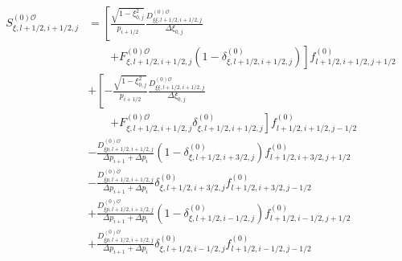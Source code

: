 \begin{itemize}
\begin{align}
S_{\xi,l+1/2,i+1/2,j}^{\left(  0\right)  \mathcal{O}} &  =\left[  \frac
{\sqrt{1-\xi_{0,j}^{2}}}{p_{i+1/2}}\frac{D_{\xi\xi,l+1/2,i+1/2,j}%
^{(0)\mathcal{O}}}{\Delta\xi_{0,j}}\right.\nonumber\\&\qquad\left.+F_{\xi,l+1/2,i+1/2,j}^{(0)\mathcal{O}%
}\left(  1-\delta_{\xi,l+1/2,i+1/2,j}^{\left(  0\right)  }\right)
\right]
f_{l+1/2,i+1/2,j+1/2}^{\left(  0\right)  }\label{sxi0dis}\\
&  +\left[  -\frac{\sqrt{1-\xi_{0,j}^{2}}}{p_{i+1/2}}\frac{D_{\xi
\xi,l+1/2,i+1/2,j}^{(0)\mathcal{O}}}{\Delta\xi_{0,j}}\right.\nonumber\\&\qquad\left.+F_{\xi,l+1/2,i+1/2,j}%
^{(0)\mathcal{O}}\delta_{\xi,l+1/2,i+1/2,j}^{\left(  0\right)
}\right]
f_{l+1/2,i+1/2,j-1/2}^{\left(  0\right)  }\nonumber\\
&  -\frac{D_{\xi p,l+1/2,i+1/2,j}^{(0)\mathcal{O}}}{\Delta p_{i+1}+\Delta
p_{i}}\left(  1-\delta_{\xi,l+1/2,i+3/2,j}^{\left(  0\right)  }\right)
f_{l+1/2,i+3/2,j+1/2}^{\left(  0\right)  }\nonumber\\
&  -\frac{D_{\xi p,l+1/2,i+1/2,j}^{(0)\mathcal{O}}}{\Delta p_{i+1}+\Delta
p_{i}}\delta_{\xi,l+1/2,i+3/2,j}^{\left(  0\right)  }f_{l+1/2,i+3/2,j-1/2}%
^{\left(  0\right)  }\nonumber\\
&  +\frac{D_{\xi p,l+1/2,i+1/2,j}^{(0)\mathcal{O}}}{\Delta p_{i+1}+\Delta
p_{i}}\left(  1-\delta_{\xi,l+1/2,i-1/2,j}^{\left(  0\right)  }\right)
f_{l+1/2,i-1/2,j+1/2}^{\left(  0\right)  }\nonumber\\
&  +\frac{D_{\xi p,l+1/2,i+1/2,j}^{(0)\mathcal{O}}}{\Delta p_{i+1}+\Delta
p_{i}}\delta_{\xi,l+1/2,i-1/2,j}^{\left(  0\right)  }f_{l+1/2,i-1/2,j-1/2}%
^{\left(  0\right)  }\nonumber
\end{align}
\end{itemize}
